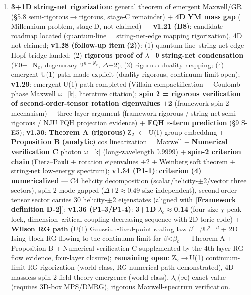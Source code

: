 \documentclass[12pt]{article}
\newcommand{\mtag}[1]{\textbf{[#1]}}
\newcommand{\up}[1]{\ensuremath{^{#1}}}
\newcommand{\down}[1]{\ensuremath{_{#1}}}
\begin{document}
\begin{enumerate}
\item \textbf{3+1D string-net rigorization}: general theorem of emergent Maxwell/GR (\S{}5.8 semi-rigorous\ensuremath{\to}rigorous, stage-C remainder) + \textbf{4D YM mass gap} (= Millennium problem, stage D, not claimed) --- \textbf{v1.21 (B8)}: candidate roadmap located (quantum-line = string-net-edge mapping rigorization), 4D not claimed; \textbf{v1.28 (follow-up item (2))}: (1) quantum-line--string-net-edge Hopf bridge landed; (2) \textbf{rigorous proof of \ensuremath{\lambda}=0 string-net condensation} (E0=\ensuremath{-}N\down{c}, degeneracy 2\up{n-N\down{c}}, \ensuremath{\Delta}=2); (3) rigorous duality mapping; (4) emergent U(1) path made explicit (duality rigorous, continuum limit open); \textbf{v1.29}: emergent U(1) path completed (Villain compactification + Coulomb-phase Maxwell \ensuremath{\omega}=|k|, literature citation); \textbf{spin 2 = rigorous verification of second-order-tensor rotation eigenvalues \ensuremath{\pm}2} (framework spin-2 mechanism) + three-layer argument (framework rigorous / string-net semi-rigorous / NJU FQH projection evidence) + \textbf{FQH \ensuremath{\varepsilon}-term prediction} (\S{}9 S-E5); \textbf{v1.30}: \textbf{Theorem A (rigorous)} Z\down{2} \ensuremath{\subset} U(1) group embedding + \textbf{Proposition B (analytic)} cos linearization = Maxwell + \textbf{Numerical verification C} photon \ensuremath{\omega}=|k| (long-wavelength 0.9999) + \textbf{spin-2 criterion chain} (Fierz--Pauli + rotation eigenvalues \ensuremath{\pm}2 + Weinberg soft theorem + string-net low-energy spectrum); \textbf{v1.34 (P1-1)}: \textbf{criterion (4) numericalized} --- C4 helicity decomposition (scalar/helicity-\ensuremath{\pm}2/vector three sectors), spin-2 mode gapped (\ensuremath{\Delta}\ensuremath{\pm}2\ensuremath{\approx}0.49 size-independent), second-order-tensor sector carries 30 helicity-\ensuremath{\pm}2 eigenstates (aligned with \mtag{Framework definition D-2}); \textbf{v1.36 (P1-3/P1-4)}: \textbf{3+1D \ensuremath{\lambda}\down{c}\ensuremath{\approx}0.14} (four-size \ensuremath{\chi}-peak lock, dimension--critical-coupling decreasing sequence with 2D toric code) + \textbf{Wilson RG path} (U(1) Gaussian-fixed-point scaling law \ensuremath{\beta}\ensuremath{^\prime}=\ensuremath{\beta}b\up{2-d} + 2D Ising block RG flowing to the continuum limit for \ensuremath{\beta}<\ensuremath{\beta}\down{c} --- Theorem A + Proposition B + Numerical verification C supplemented by the 4th-layer RG-flow evidence, four-layer closure); \textbf{remaining open}: Z\down{2}\ensuremath{\to}U(1) continuum-limit RG rigorization (world-class, RG numerical path demonstrated), 4D massless spin-2 field-theory emergence (world-class), \ensuremath{\lambda}\down{c}(\ensuremath{\infty}) exact value (requires 3D-box MPS/DMRG), rigorous Maxwell-spectrum verification.
\end{enumerate}
\end{document}
